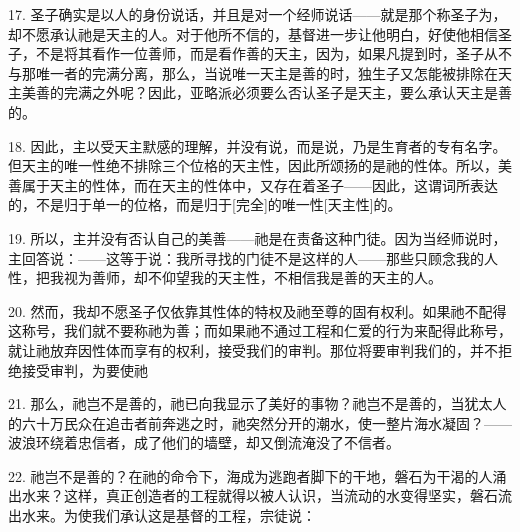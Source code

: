 17. 圣子确实是以人的身份说话，并且是对一个经师说话——就是那个称圣子为，却不愿承认祂是天主的人。对于他所不信的，基督进一步让他明白，好使他相信圣子，不是将其看作一位善师，而是看作善的天主，因为，如果凡提到时，圣子从不与那唯一者的完满分离，那么，当说唯一天主是善的时，独生子又怎能被排除在天主美善的完满之外呢？因此，亚略派必须要么否认圣子是天主，要么承认天主是善的。\par

18. 因此，主以受天主默感的理解，并没有说，而是说，乃是生育者的专有名字。但天主的唯一性绝不排除三个位格的天主性，因此所颂扬的是祂的性体。所以，美善属于天主的性体，而在天主的性体中，又存在着圣子——因此，这谓词所表达的，不是归于单一的位格，而是归于[完全]的唯一性[天主性]的。\par

19. 所以，主并没有否认自己的美善——祂是在责备这种门徒。因为当经师说时，主回答说：——这等于说：我所寻找的门徒不是这样的人——那些只顾念我的人性，把我视为善师，却不仰望我的天主性，不相信我是善的天主的人。\par

\par

20. 然而，我却不愿圣子仅依靠其性体的特权及祂至尊的固有权利。如果祂不配得这称号，我们就不要称祂为善；而如果祂不通过工程和仁爱的行为来配得此称号，就让祂放弃因性体而享有的权利，接受我们的审判。那位将要审判我们的，并不拒绝接受审判，为要使祂\par

21. 那么，祂岂不是善的，祂已向我显示了美好的事物？祂岂不是善的，当犹太人的六十万民众在追击者前奔逃之时，祂突然分开的潮水，使一整片海水凝固？——波浪环绕着忠信者，成了他们的墙壁，却又倒流淹没了不信者。\par

22. 祂岂不是善的？在祂的命令下，海成为逃跑者脚下的干地，磐石为干渴的人涌出水来？这样，真正创造者的工程就得以被人认识，当流动的水变得坚实，磐石流出水来。为使我们承认这是基督的工程，宗徒说：\par

